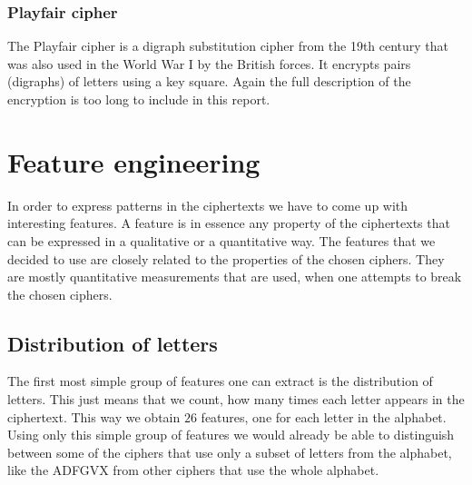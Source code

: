 \documentclass[a4paper]{article}
\begin{document}
\subsubsection{Playfair cipher}
The Playfair cipher is a digraph substitution cipher from the 19th century that was also used in the World War I by the British forces. It encrypts pairs (digraphs) of letters using a key square. Again the full description of the encryption is too long to include in this report.



\section{Feature engineering}
In order to express patterns in the ciphertexts we have to come up with interesting features. A feature is in essence any property of the ciphertexts that can be expressed in a qualitative or a quantitative way. The features that we decided to use are closely related to the properties of the chosen ciphers. They are mostly quantitative measurements that are used, when one attempts to break the chosen ciphers.

\subsection{Distribution of letters}
The first most simple group of features one can extract is the distribution of letters. This just means that we count, how many times each letter appears in the ciphertext. This way we obtain $26$ features, one for each letter in the alphabet. Using only this simple group of features we would already be able to distinguish between some of the ciphers that use only a subset of letters from the alphabet, like the ADFGVX from other ciphers that use the whole alphabet.
\end{document}
